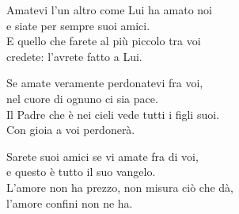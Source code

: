 
\strofa Amatevi l'un altro come Lui ha amato noi\\
e siate per sempre suoi amici.\\
E quello che farete al più piccolo tra voi\\
credete: l'avrete fatto a Lui.

\spazio


\spazio

\strofa Se amate veramente perdonatevi fra voi,\\
nel cuore di ognuno ci sia pace.\\
Il Padre che è nei cieli vede tutti i figli suoi.\\
Con gioia a voi perdonerà.

\spazio


\spazio

\strofa Sarete suoi amici se vi amate fra di voi,\\
e questo è tutto il suo vangelo.\\
L'amore non ha prezzo, non misura ciò che dà,\\
l'amore confini non ne ha.

\spazio

